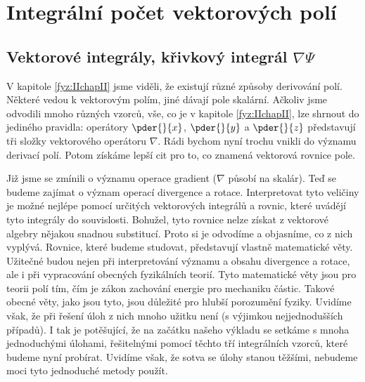 \graphicspath{{../src/FYZ/img/}}
\setchaptertoc
\chapter{Integrální počet vektorových polí}\label{fyz:IIchapIII}


  \section{Vektorové integrály, křivkový integrál \texorpdfstring{\(\nabla\Psi\)}{nabla 
  psi}}\label{fyz:IIchapIIIsecI}
    V kapitole \ref{fyz:IIchapII} jsme viděli, že existují různé způsoby derivování polí. Některé 
    vedou k vektorovým polím, jiné dávají pole skalární. Ačkoliv jsme odvodili mnoho různých 
    vzorců, vše, co je v kapitole \ref{fyz:IIchapII}, lze shrnout do jediného pravidla: operátory 
    \(\pder{ }{x}\), \(\pder{ }{y}\) a \(\pder{ }{z}\) představují tři složky vektorového operátoru 
    \(\nabla\). Rádi bychom nyní trochu vnikli do významu derivací polí. Potom získáme lepší cit 
    pro to, co znamená vektorová rovnice pole.
    
    Již jsme se zmínili o významu operace gradient (\(\nabla\) působí na skalár). Teď se budeme  
    zajímat o význam operací divergence a rotace. Interpretovat tyto veličiny je možné nejlépe 
    pomocí určitých vektorových integrálů a rovnic, které uvádějí tyto integrály do souvislosti. 
    Bohužel, tyto rovnice nelze získat z vektorové algebry nějakou snadnou substitucí. Proto si je 
    odvodíme a objasníme, co z nich vyplývá. Rovnice, které budeme studovat, představují vlastně 
    matematické věty. Užitečné budou nejen při interpretování významu a obsahu divergence a rotace, 
    ale i při vypracování obecných fyzikálních teorií. Tyto matematické věty jsou pro teorii polí 
    tím, čím je zákon zachování energie pro mechaniku částic. Takové obecné věty, jako jsou tyto, 
    jsou důležité pro hlubší porozumění fyziky. Uvidíme však, že při řešení úloh z nich mnoho 
    užitku není (s výjimkou nejjednodušších případů). I tak je potěšující, že na začátku našeho 
    výkladu se setkáme s mnoha jednoduchými úlohami, řešitelnými pomocí těchto tří integrálních 
    vzorců, které budeme nyní probírat. Uvidíme však, že sotva se úlohy stanou těžšími, nebudeme 
    moci tyto jednoduché metody použít.

